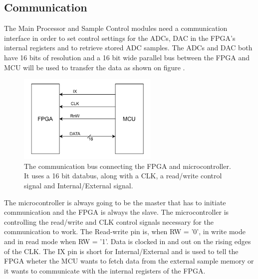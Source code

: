 \subsection{Communication} \label{subsec:Communication}
The Main Processor and Sample Control modules need a communication interface in order to set control settings for the ADCs, DAC in the FPGA's internal registers and to retrieve stored ADC samples. The ADCs and DAC  both have 16 bits of resolution and a 16 bit wide parallel bus between the FPGA and MCU will be used to transfer the data as shown on figure .

\begin{figure}[H]
    \centering
    \includegraphics[clip, trim=0 0 0 0, width=0.6\textwidth]{Sections/7_SystemDesign/Figures/CommPort_Block.pdf}
    \caption{The communication bus connecting the FPGA and microcontroller. It uses a 16 bit databus, along with a CLK, a read/write control signal and Internal/External signal.}
    \label{fig_7_2_1_CommBus}
\end{figure}

The microcontroller is always going to be the master that has to initiate communication and the FPGA is always the slave. The microcontroller is controlling the read/write and CLK control signals necessary for the communication to work. The Read-write pin is, when  RW = '0', in write mode and in read mode when RW = '1'. Data is clocked in and out on the rising edges of the CLK. The IX pin is short for Internal/External and is used to tell the FPGA wheter the MCU wants to fetch data from the external sample memory or it wants to communicate with the internal registers of the FPGA. 

